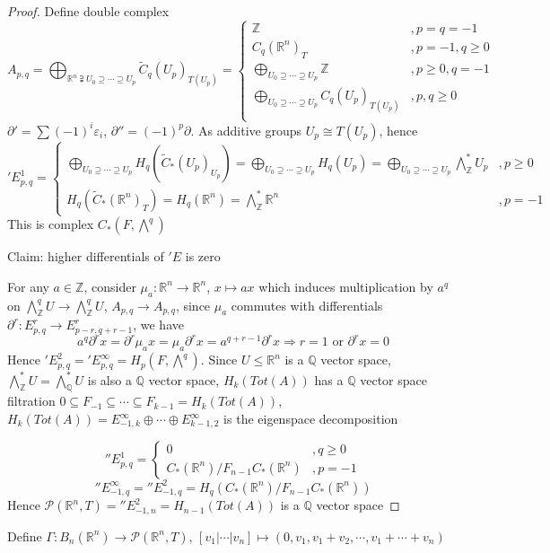 \documentclass[../main.tex]{subfiles}
\begin{document}
\begin{proof}
Define double complex
\[A_{p,q}=\bigoplus_{\mathbb R^n\supsetneqq U_0\supseteq\cdots\supseteq U_p}\widetilde{C}_q(U_p)_{T(U_p)}=\begin{cases}
\mathbb Z &,p=q=-1 \\
C_q(\mathbb R^n)_T &,p=-1, q\geq0 \\
\displaystyle\bigoplus_{U_0\supseteq\cdots\supseteq U_p}\mathbb Z &,p\geq0,q=-1 \\
\displaystyle\bigoplus_{U_0\supseteq\cdots\supseteq U_p}C_q(U_p)_{T(U_p)} &,p, q\geq0 \\
\end{cases}\]
$\partial'=\sum(-1)^i\varepsilon_i$, $\partial''=(-1)^p\partial$. As additive groups $U_p\cong T(U_p)$, hence
\['E^1_{p,q}=\begin{cases}
\displaystyle\bigoplus_{U_0\supseteq\cdots\supseteq U_p}H_q(\widetilde{C}_*(U_p)_{U_p})=\bigoplus_{U_0\supseteq\cdots\supseteq U_p}H_q(U_p)=\bigoplus_{U_0\supseteq\cdots\supseteq U_p}\textstyle\bigwedge^*_{\mathbb Z}U_p &,p\geq0 \\
H_q(\widetilde{C}_*(\mathbb R^n)_{T})=H_q(\mathbb R^n)=\bigwedge^*_{\mathbb Z}\mathbb R^n &,p=-1
\end{cases}\]
This is complex $C_*(F,\bigwedge^q)$ \par
Claim: higher differentials of $'E$ is zero \par
For any $a\in\mathbb Z$, consider $\mu_a:\mathbb R^n\to\mathbb R^n$, $x\mapsto ax$ which induces multiplication by $a^q$ on $\bigwedge^q_{\mathbb Z}U\to \bigwedge^q_{\mathbb Z}U$, $A_{p,q}\to A_{p,q}$, since $\mu_a$ commutes with differentials $\partial^r:E^r_{p,q}\to E^r_{p-r,q+r-1}$, we have
\[a^q\partial^rx=\partial^r\mu_ax=\mu_a\partial^rx=a^{q+r-1}\partial^rx\Rightarrow r=1\text{ or }\partial^rx=0\]
Hence $'E^2_{p,q}='E^\infty_{p,q}=H_p(F,\bigwedge^q)$. Since $U\leq\mathbb R^n$ is a $\mathbb Q$ vector space, $\bigwedge^*_{\mathbb Z}U=\bigwedge^*_{\mathbb Q}U$ is also a $\mathbb Q$ vector space, $H_k(Tot(A))$ has a $\mathbb Q$ vector space filtration $0\subseteq F_{-1}\subseteq\cdots\subseteq F_{k-1}=H_k(Tot(A))$, $H_k(Tot(A))=E^\infty_{-1,k}\oplus\cdots\oplus E^\infty_{k-1,2}$ is the eigenspace decomposition \par
\[''E^1_{p,q}=\begin{cases}
0&,q\geq0 \\
C_*(\mathbb R^n)/F_{n-1}C_*(\mathbb R^n)&,p=-1
\end{cases}\]
\[''E^\infty_{-1,q}=''E^2_{-1,q}=H_q(C_*(\mathbb R^n)/F_{n-1}C_*(\mathbb R^n))\]
Hence $\mathcal{P}(\mathbb R^n,T)=''E^2_{-1,n}=H_{n-1}(Tot(A))$ is a $\mathbb Q$ vector space
\end{proof}

\begin{definition}
Define $\Gamma: B_n(\mathbb R^n)\to\mathcal{P}(\mathbb R^n,T)$, $[v_1|\cdots|v_n]\mapsto(0,v_1,v_1+v_2,\cdots,v_1+\cdots+v_n)$
\end{definition}
\end{document}
